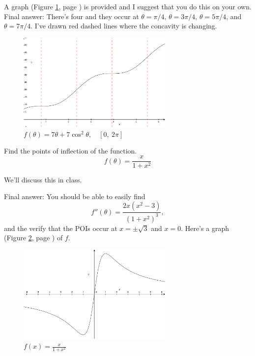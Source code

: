 \documentclass[12pt,addpoints, answers, fleqn]{exam}
\begin{document}
\begin{questions}
\begin{solution}
A graph (Figure \ref{fig:graph121040401}, page \pageref{fig:graph121040401}) is provided and I suggest that you do this on your own. Final answer: There's four and they occur at $\theta = \pi/4$, $\theta = 3\pi/4$, $\theta = 5\pi/4$, and $\theta = 7\pi/4$. I've drawn red dashed lines where the concavity is changing.
\end{solution}
\begin{figure}[htbp] %
   \centering
   \includegraphics[width=3in]{./graphics/graph121040401.pdf} 
   \caption{$f\left( \theta \right) = 7 \theta + 7 \cos^2 \theta, \quad    \left[0, \ 2\pi \right]$}
   \label{fig:graph121040401}
\end{figure}

\question Find the points of inflection of the function.
\[
f\left( \theta \right) = \frac{x}{1+x^2}
\]
\begin{solution}
We'll discuss this in class.

Final answer: You should be able to easily find
\[
f''\left( \theta \right) = \frac{2x\left( x^2 - 3 \right)}{\left( 1+x^2 \right)^3},
\]
and the verify that the POIs occur at $x= \pm \sqrt{3}$ and $x=0$. Here's a graph (Figure \ref{fig:graph121040402}, page \pageref{fig:graph121040402})  of $f$.
\end{solution}
\begin{figure}[htbp] %
   \centering
   \includegraphics[width=3in]{./graphics/graph121040402.pdf} 
   \caption{$\displaystyle f\left( x \right) = \frac{x}{1+x^2}$}
   \label{fig:graph121040402}
\end{figure}


\end{questions}
\end{document}
